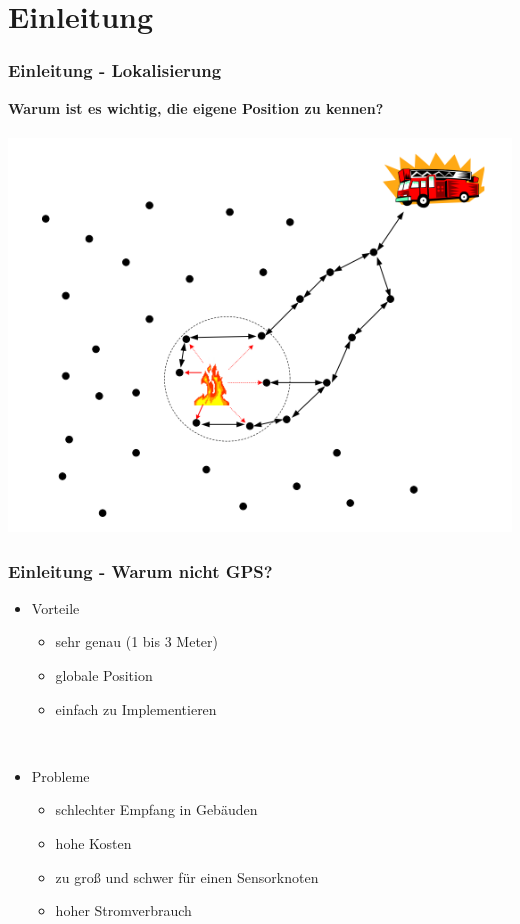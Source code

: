 \section{Einleitung}
\label{sec:einleitung}

\begin{frame}
  \frametitle{Einleitung - Lokalisierung}

  \begin{center}
    \textbf{Warum ist es wichtig, die eigene Position zu kennen?}\\~\\

    \includegraphics[scale=0.35]{img/lokalisierung_1}
  \end{center}
\end{frame}

\begin{frame}
  \frametitle{Einleitung - Warum nicht GPS?}

  \begin{itemize}
  \item Vorteile
    \begin{itemize}
    \item sehr genau (1 bis 3 Meter)
    \item globale Position
    \item einfach zu Implementieren
    \end{itemize}
  ~\\
  \item Probleme
    \begin{itemize}
    \item schlechter Empfang in Gebäuden
    \item hohe Kosten
    \item zu groß und schwer für einen Sensorknoten
    \item hoher Stromverbrauch
    \end{itemize}
  \end{itemize}
\end{frame}
